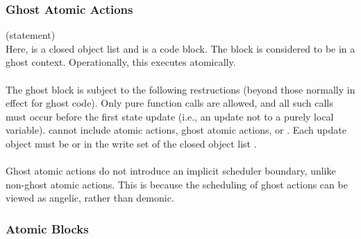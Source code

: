 \documentclass[preprint,nocopyrightspace]{sigplanconf}
\begin{document}
{{{\subsubsection{Ghost Atomic Actions}
 (statement)\\
Here,  is a closed object list and  is a code
block. The block is considered to be in a ghost context. 
Operationally, this executes  atomically.
\\\\
The ghost block is subject to the following restructions (beyond those
normally in effect for ghost code). Only pure function calls are
allowed, and all such calls must occur before the first state update
(i.e., an update not to a purely local variable). 
 cannot include atomic actions, ghost atomic
actions,  or . Each update object
must be \vcc{\mutable} or in the write set of the closed object
list . 
\\\\
Ghost atomic actions do not introduce an implicit scheduler
boundary, unlike non-ghost atomic actions. This is because the
scheduling of ghost actions can be viewed as angelic, rather than
demonic. 

\subsubsection{Atomic Blocks}

}}}
\end{document}
